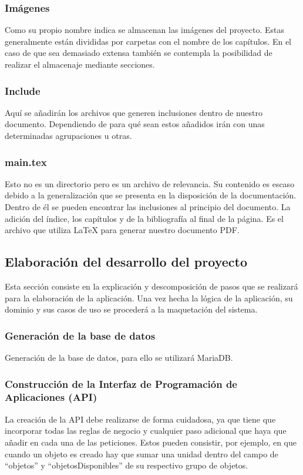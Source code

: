 \subsubsection{Imágenes}
Como su propio nombre indica se almacenan las imágenes del proyecto. Estas generalmente están divididas por carpetas con el nombre de los capítulos. En el caso de que sea demasiado extensa también se contempla la posibilidad de realizar el almacenaje mediante secciones.

\subsubsection{Include}
Aquí se añadirán los archivos que generen inclusiones dentro de nuestro documento. Dependiendo de para qué sean estos añadidos irán con unas determinadas agrupaciones u otras.

\subsubsection{main.tex}
Esto no es un directorio pero es un archivo de relevancia. Su contenido es escaso debido a la generalización que se presenta en la disposición de la documentación. Dentro de él se pueden encontrar las inclusiones al principio del documento. La adición del índice, los capítulos y de la bibliografía al final de la página. Es el archivo que utiliza LaTeX para generar nuestro documento PDF.


\subsection{Elaboración del desarrollo del proyecto}

Esta sección consiste en la explicación y descomposición de pasos que se realizará para la elaboración de la aplicación. Una vez hecha la lógica de la aplicación, su dominio y sus casos de uso se procederá a la maquetación del sistema.

\subsubsection{Generación de la base de datos}

Generación de la base de datos, para ello se utilizará MariaDB.

\subsubsection{Construcción de la Interfaz de Programación de Aplicaciones (API)}
La creación de la API debe realizarse de forma cuidadosa, ya que tiene que incorporar todas las reglas de negocio y cualquier paso adicional que haya que añadir en cada una de las peticiones. Estos pueden consistir, por ejemplo, en que cuando un objeto es creado hay que sumar una unidad dentro del campo de ``objetos'' y ``objetosDisponibles'' de su respectivo grupo de objetos.

